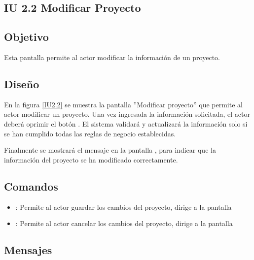\subsection{IU 2.2 Modificar Proyecto}

\subsection{Objetivo}
	Esta pantalla permite al actor modificar la información de un proyecto.
\subsection{Diseño}
	En la figura \ref{IU2.2} se muestra la pantalla ''Modificar proyecto'' que permite al actor modificar un proyecto.
	Una vez ingresada la información solicitada, el actor deberá oprimir el botón  . El sistema validará y actualizará la información solo si se han cumplido todas las reglas de negocio establecidas.
	
	Finalmente se mostrará el mensaje  en la pantalla , para indicar que la información del proyecto se ha modificado correctamente.

\label{IU2.2}
\subsection{Comandos}
\begin{itemize}
	\item {}: Permite al actor guardar los cambios del proyecto, dirige a la pantalla 
	\item {}: Permite al actor cancelar los cambios del proyecto, dirige a la pantalla 
\end{itemize}

\subsection{Mensajes}

